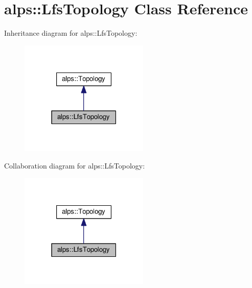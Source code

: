 \hypertarget{classalps_1_1LfsTopology}{}\section{alps\+:\+:Lfs\+Topology Class Reference}
\label{classalps_1_1LfsTopology}


Inheritance diagram for alps\+:\+:Lfs\+Topology\+:
\nopagebreak
\begin{figure}[H]
\begin{center}
\leavevmode
\includegraphics[width=174pt]{classalps_1_1LfsTopology__inherit__graph}
\end{center}
\end{figure}


Collaboration diagram for alps\+:\+:Lfs\+Topology\+:
\nopagebreak
\begin{figure}[H]
\begin{center}
\leavevmode
\includegraphics[width=174pt]{classalps_1_1LfsTopology__coll__graph}
\end{center}
\end{figure}
